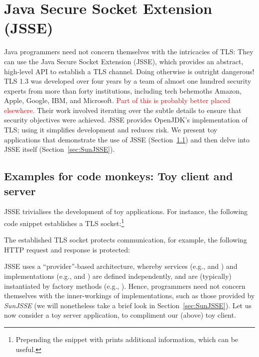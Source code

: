 \section{Java Secure Socket Extension (JSSE)}\label{sec:JSSE}

Java programmers need not concern themselves with the intricacies of TLS: They can 
use the Java Secure Socket Extension (JSSE), which provides an abstract, high-level
API to establish a TLS channel. Doing otherwise is outright dangerous! TLS 1.3 
was developed over four years by a team of almost one hundred security experts 
from more than forty institutions, including tech behemoths Amazon, Apple, Google, 
IBM, and Microsoft. \ifPresentationNotes \textcolor{red}{Part of this is probably 
better placed elsewhere.} \fi
Their work involved iterating over the subtle 
details to ensure that security objectives were achieved. JSSE provides OpenJDK's 
implementation of TLS; using it simplifies development and reduces risk.
We present toy applications that demonstrate the use of JSSE (Section~\ref{sec:monkeys})
and then delve into JSSE itself (Section~\ref{sec:SunJSSE}).

\subsection{Examples for code monkeys: Toy client and server}\label{sec:monkeys}

\ifPresentationNotes
{}
\fi

JSSE trivialises the development of toy applications. For instance, the following code 
snippet establishes a TLS socket:\footnote{%
  Prepending the snippet with 
  prints additional information, which can be useful.}



\noindent 
The established TLS socket protects communication, for example, the following HTTP
request and response is protected:



\noindent
JSSE uses a ``provider''-based architecture, whereby services (e.g.,  and )
and implementations (e.g.,  and ) are defined independently, 
and are (typically) instantiated by factory methods (e.g., ). Hence, 
programmers need not concern themselves with the inner-workings of implementations, such as those provided 
by \emph{SunJSSE} (we will nonetheless take a brief look in Section~\ref{sec:SunJSSE}). 
Let us now consider a toy server application, to compliment our (above) toy client.

